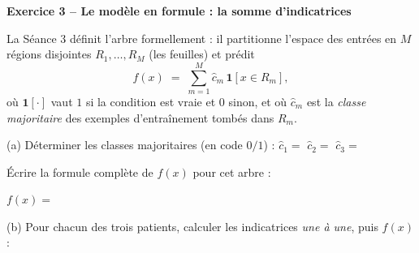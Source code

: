 \documentclass[10pt,a4paper]{article}
\begin{document}
\textbf{\large Exercice 3 -- Le modèle en formule : la somme d'indicatrices}

\vspace{0.15cm}

La Séance 3 définit l'arbre formellement : il partitionne l'espace des entrées en $M$ régions disjointes $R_1, \dots, R_M$ (les feuilles) et prédit
\[
f(x) \;=\; \sum_{m=1}^{M} \hat c_m \, \mathbf{1}[x \in R_m],
\]
où $\mathbf{1}[\cdot]$ vaut $1$ si la condition est vraie et $0$ sinon, et où $\hat c_m$ est la \emph{classe majoritaire} des exemples d'entraînement tombés dans $R_m$.

\vspace{0.15cm}

\vspace{0.2cm}
(a) Déterminer les classes majoritaires (en code $0/1$) : $\hat c_1 = $ \makebox[1.2cm]{\dotfill} \quad $\hat c_2 = $ \makebox[1.2cm]{\dotfill} \quad $\hat c_3 = $ \makebox[1.2cm]{\dotfill}

Écrire la formule complète de $f(x)$ pour cet arbre :

\vspace{0.35cm}
$f(x) = $ \dotfill

\vspace{0.25cm}
(b) Pour chacun des trois patients, calculer les indicatrices \emph{une à une}, puis $f(x)$ :
\end{document}
